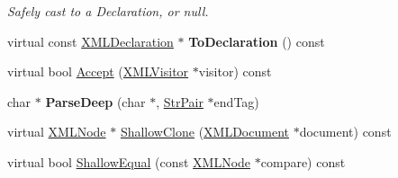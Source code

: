 \begin{DoxyCompactItemize}
\begin{DoxyCompactList}\small\item\em Safely cast to a Declaration, or null. \end{DoxyCompactList}\item 
\mbox{\label{classtinyxml2_1_1XMLDeclaration_aa20c3315b18c3b88830dccf5c493259b}} 
virtual const \hyperlink{classtinyxml2_1_1XMLDeclaration}{X\+M\+L\+Declaration} $\ast$ {\bfseries To\+Declaration} () const
\item 
virtual bool \hyperlink{classtinyxml2_1_1XMLDeclaration_a5f376019fb34752eb248548f42f32045}{Accept} (\hyperlink{classtinyxml2_1_1XMLVisitor}{X\+M\+L\+Visitor} $\ast$visitor) const
\item 
\mbox{\label{classtinyxml2_1_1XMLDeclaration_a2f899611c8c34e35a59e005b07316fc3}} 
char $\ast$ {\bfseries Parse\+Deep} (char $\ast$, \hyperlink{classtinyxml2_1_1StrPair}{Str\+Pair} $\ast$end\+Tag)
\item 
virtual \hyperlink{classtinyxml2_1_1XMLNode}{X\+M\+L\+Node} $\ast$ \hyperlink{classtinyxml2_1_1XMLDeclaration_a118d47518dd9e522644e42efa259aed7}{Shallow\+Clone} (\hyperlink{classtinyxml2_1_1XMLDocument}{X\+M\+L\+Document} $\ast$document) const
\item 
virtual bool \hyperlink{classtinyxml2_1_1XMLDeclaration_aa26b70011694e9b9e9480b929e9b78d6}{Shallow\+Equal} (const \hyperlink{classtinyxml2_1_1XMLNode}{X\+M\+L\+Node} $\ast$compare) const
\end{DoxyCompactItemize}
